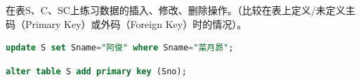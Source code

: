 \documentclass[12pt, a4paper]{report}
\begin{document}
在表S、C、SC上练习数据的插入、修改、删除操作。（比较在表上定义/未定义主码（Primary Key）或外码（Foreign Key）时的情况）。\\

\begin{lstlisting}[language=SQL]
    update S set Sname="阿俊" where Sname="菜月昴";
\end{lstlisting}

\begin{figure}[H] %
    \centering %
\end{figure}

\begin{lstlisting}[language=SQL]
    alter table S add primary key (Sno);
\end{lstlisting}
\end{document}
